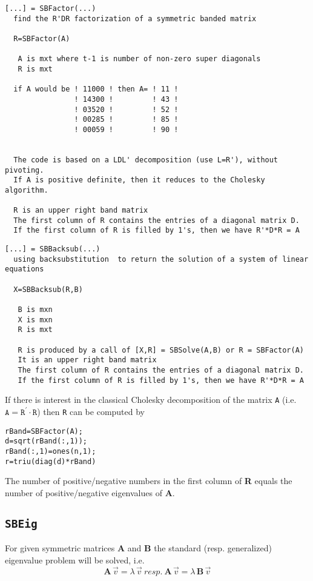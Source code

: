 \documentclass[11pt]{article}
\newcommand{\text}[1]{\ #1 \ }
\begin{document}
\begin{verbatim}
[...] = SBFactor(...)
  find the R'DR factorization of a symmetric banded matrix

  R=SBFactor(A)

   A is mxt where t-1 is number of non-zero super diagonals
   R is mxt

  if A would be ! 11000 ! then A= ! 11 !
                ! 14300 !         ! 43 !
                ! 03520 !         ! 52 !
                ! 00285 !         ! 85 !
                ! 00059 !         ! 90 !


  The code is based on a LDL' decomposition (use L=R'), without pivoting.
  If A is positive definite, then it reduces to the Cholesky algorithm.

  R is an upper right band matrix
  The first column of R contains the entries of a diagonal matrix D.
  If the first column of R is filled by 1's, then we have R'*D*R = A
\end{verbatim}

\begin{verbatim}
[...] = SBBacksub(...)
  using backsubstitution  to return the solution of a system of linear equations

  X=SBBacksub(R,B)

   B is mxn
   X is mxn
   R is mxt

   R is produced by a call of [X,R] = SBSolve(A,B) or R = SBFactor(A)
   It is an upper right band matrix
   The first column of R contains the entries of a diagonal matrix D.
   If the first column of R is filled by 1's, then we have R'*D*R = A
\end{verbatim}


If there is interest in the classical Cholesky decomposition
  of the matrix \texttt{A} 
(i.e. $\mathtt{A}=\mathtt{R}^\prime\cdot \mathtt{R}$) then \texttt{R} can be
computed by
\begin{verbatim}
rBand=SBFactor(A);
d=sqrt(rBand(:,1));
rBand(:,1)=ones(n,1);
r=triu(diag(d)*rBand)
\end{verbatim}

The number of positive/negative numbers in the first column of \textbf{R}
equals the number of positive/negative eigenvalues of \textbf{A}.


\subsection{\texttt{SBEig}}
For given symmetric matrices \textbf{A} and \textbf{B} the standard
(resp. generalized) eigenvalue problem will be solved, i.e.
\[ \mathbf{A}\,\vec v=\lambda\,\vec v \text{resp.}
   \mathbf{A}\,\vec v=\lambda\,\mathbf{B}\,\vec v  \]
\end{document}
